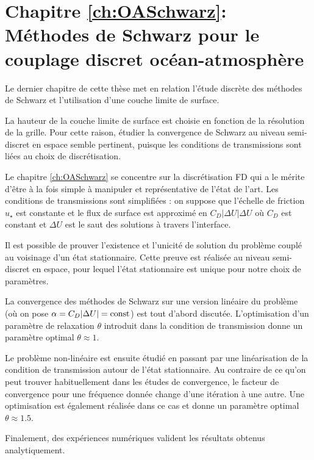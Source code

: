 \section*{Chapitre \ref{ch:OASchwarz}: Méthodes de Schwarz pour le couplage
discret océan-atmosphère}
Le dernier chapitre de cette thèse met en relation l'étude discrète
des méthodes de Schwarz et l'utilisation d'une couche limite de
surface.
	\par La hauteur de la couche limite de surface est
		choisie en fonction de la résolution de la grille.
		Pour cette raison, étudier la convergence de Schwarz
		au niveau semi-discret en espace semble pertinent,
		puisque les conditions de transmissions sont
		liées au choix de discrétisation.
	\par Le chapitre \ref{ch:OASchwarz} se concentre sur la discrétisation FD
		qui a le mérite d'être à la fois simple à
		manipuler et représentative de l'état de l'art.
		Les conditions de transmissions sont simplifiées :
		on suppose que l'échelle de friction $u_\star$
		est constante et le flux de surface est approximé
		en $C_D |\Delta U| \Delta U$ où $C_D$ est constant
		et $\Delta U$ est le saut des solutions à travers
		l'interface.
	\par Il est possible de prouver l'existence et l'unicité de
		solution du problème couplé au voisinage d'un état
		stationnaire. Cette preuve est réalisée au niveau
		semi-discret en espace, pour lequel l'état
		stationnaire est unique pour notre choix de
		paramètres.
	\par La convergence des méthodes de Schwarz sur une version
		linéaire du problème (où on pose
		$\alpha=C_D |\Delta U| = {\rm const}$)
		est tout d'abord discutée. L'optimisation d'un
		paramètre de relaxation $\theta$ introduit dans
		la condition de transmission donne un paramètre
		optimal $\theta \approx 1$.
	\par Le problème non-linéaire est ensuite étudié en passant
		par une linéarisation de la condition de transmission
		autour de l'état stationnaire. Au contraire
		de ce qu'on peut trouver habituellement dans
		les études de convergence,
		le facteur de convergence pour une fréquence donnée
		change d'une itération à une autre. 
		Une optimisation est également réalisée dans ce cas
		et donne un paramètre optimal $\theta \approx 1.5$.
	\par Finalement, des expériences numériques
		valident les résultats obtenus analytiquement.
